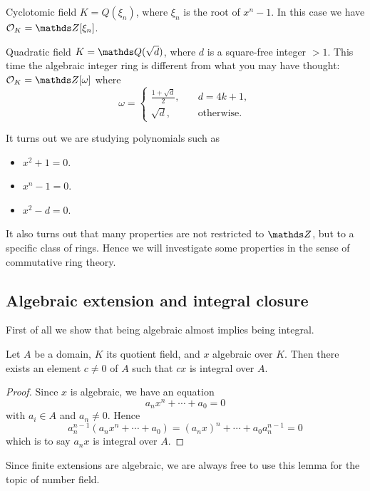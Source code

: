 			\begin{example}
				Cyclotomic field $K=Q(\xi_n)$, where $\xi_n$ is the root of $x^n-1$. In this case we have $\OK = \Z[\xi_n]$.
			\end{example}
			
			\begin{example}
				Quadratic field $K=\Q(\sqrt{d})$, where $d$ is a square-free integer $>1$. This time the algebraic integer ring is different from what you may have thought: $\OK = \Z[\omega]$ where
				\[
				\omega = \begin{cases}
					\frac{1+\sqrt{d}}{2}, &\quad d = 4k+1, \\
					\sqrt{d}, &\quad \text{otherwise}.
				\end{cases}
				\]
			\end{example}
			It turns out we are studying polynomials such as
			\begin{itemize}
				\item $x^2+1=0$.
				\item $x^n-1=0$.
				\item $x^2-d=0$.
			\end{itemize}
		It also turns out that many properties are not restricted to $\Z$, but to a specific class of rings. Hence we will investigate some properties in the sense of commutative ring theory.
		\subsection{Algebraic extension and integral closure}
			First of all we show that being algebraic almost implies being integral. 
			\begin{lemma}\label{alg-int}
				Let $A$ be a domain, $K$ its quotient field, and $x$ algebraic over $K$. Then there exists an element $c \ne 0$ of $A$ such that $cx$ is integral over $A$.
			\end{lemma}
			\begin{proof}
				Since $x$ is algebraic, we have an equation
				\[
					a_nx^n+\cdots+a_0=0
				\]
				with $a_i \in A$ and $a_n \ne 0$. Hence
				\[
					a_n^{n-1}(a_nx^n+\cdots+a_0)=(a_nx)^n+\cdots+a_0a_n^{n-1}=0
				\]
				which is to say $a_nx$ is integral over $A$. 
			\end{proof}
			
			Since finite extensions are algebraic, we are always free to use this lemma for the topic of number field.
			
